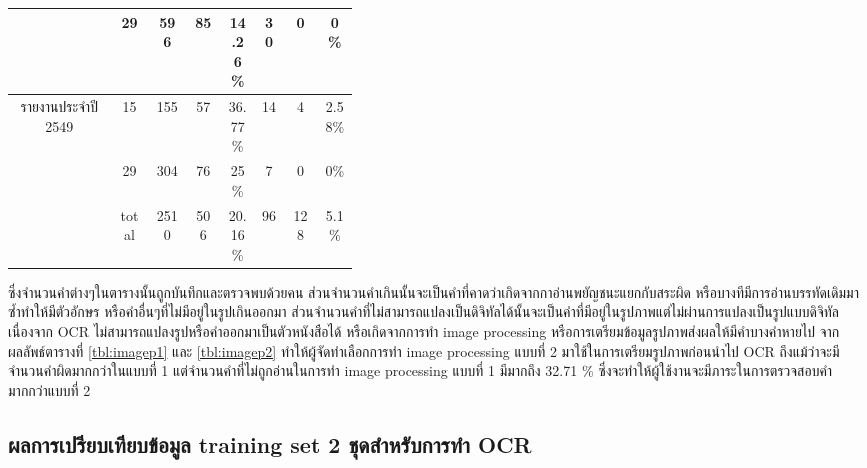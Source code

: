 \begin{table}[H]
\begin{tabular}{|c|c|c|p{0.1\linewidth}|p{0.1\linewidth}|c|p{0.1\linewidth}|p{0.1\linewidth}|}
                                                & 29                         & \multicolumn{1}{c|}{596 }      & \multicolumn{1}{c|}{85 }         & \multicolumn{1}{c|}{14.26\%} & \multicolumn{1}{c|}{30}     & \multicolumn{1}{c|}{0  }             & \multicolumn{1}{c|}{0\%    } \\ \hline
            \multirow{2}{*}{รายงานประจำปี 2549}   & 15                         & \multicolumn{1}{c|}{155 }      & \multicolumn{1}{c|}{57 }         & \multicolumn{1}{c|}{36.77\%} & \multicolumn{1}{c|}{14}     & \multicolumn{1}{c|}{4  }             & \multicolumn{1}{c|}{2.58\% } \\ \cline{2-8} 
                                                & 29                         & \multicolumn{1}{c|}{304 }      & \multicolumn{1}{c|}{76 }         & \multicolumn{1}{c|}{25\%   } & \multicolumn{1}{c|}{7 }     & \multicolumn{1}{c|}{0  }             & \multicolumn{1}{c|}{0\%    } \\ \hline
            \multicolumn{1}{|l|}{}              & \multicolumn{1}{c|}{total} & \multicolumn{1}{c|}{2510}      & \multicolumn{1}{c|}{506}         & \multicolumn{1}{c|}{20.16\%} & \multicolumn{1}{c|}{96}     & \multicolumn{1}{c|}{128}             & \multicolumn{1}{c|}{5.1\%  } \\ \hline
            \end{tabular}
            \end{table}
            
ซึ่งจำนวนคำต่างๆในตารางนั้นถูกบันทึกและตรวจพบด้วยคน ส่วนจำนวนคำเกินนั้นจะเป็นคำที่คาดว่าเกิดจากกาอ่านพยัญชนะแยกกับสระผิด หรือบางทีมีการอ่านบรรทัดเดิมมาซ้ำทำให้มีตัวอักษร หรือคำอื่นๆที่ไม่มีอยู่ในรูปเกินออกมา
ส่วนจำนวนคำที่ไม่สามารถแปลงเป็นดิจิทัลได้นั้นจะเป็นคำที่มีอยู่ในรูปภาพแต่ไม่ผ่านการแปลงเป็นรูปแบบดิจิทัล เนื่องจาก OCR ไม่สามารถแปลงรูปหรือคำออกมาเป็นตัวหนังสือได้ หรือเกิดจากการทำ image processing 
หรือการเตรียมข้อมูลรูปภาพส่งผลให้มีคำบางคำหายไป
จากผลลัพธ์ตารางที่ \ref{tbl:imagep1} และ \ref{tbl:imagep2} ทำให้ผู้จัดทำเลือกการทำ image processing แบบที่ 2 มาใช้ในการเตรียมรูปภาพก่อนนำไป OCR
ถึงแม้ว่าจะมีจำนวนคำผิดมากกว่าในแบบที่ 1 แต่จำนวนคำที่ไม่ถูกอ่านในการทำ image processing แบบที่ 1 มีมากถึง 32.71 \% ซึ่งจะทำให้ผู้ใช้งานจะมีภาระในการตรวจสอบคำมากกว่าแบบที่ 2 

\subsection{ผลการเปรียบเทียบข้อมูล training set 2 ชุดสำหรับการทำ OCR}

